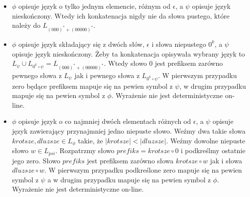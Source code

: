 \documentclass[a4paper]{article}
\begin{document}
\begin{enumerate}
\begin{itemize}
    \item $\phi$ opisuje język o tylko jednym elemencie, różnym od $\epsilon$, a $\psi$ opisuje język nieskończony. Wtedy ich konkatenacja nigdy nie da słowa pustego, które należy do $L_{(000)^* + (00000)^*}$.
    \item $\phi$ opisuje język składający się z dwóch słów, $\epsilon$ i słowa niepustego $0^k$, a $\psi$ opisuje język nieskończony. Żeby ta konkatenacja opisywała wybrany język to $L_{\psi} \cup L_{0^k \circ \psi} = L_{(000)^* + (00000)^*}$. Wtedy słowo $0$ jest prefiksem zarówno pewnego słowa z $L_{\psi}$ jak i pewnego słowa z $L_{0^k \circ \psi}$. W pierwszym przypadku zero będące prefiksem mapuje się na pewien symbol z $\psi$, w drugim przypadku mapuje się na pewien symbol z $\phi$. Wyrażenie nie jest deterministyczne on-line.

    \item $\phi$ opisuje język o co najmniej dwóch elementach różnych od $\epsilon$, a $\psi$ opisuje język zawierający przynajmniej jedno niepuste słowo. Weźmy dwa takie słowa $krotsze, dluzsze \in L_{\phi}$ takie, że $|krotsze| < |dluzsze|$. Weźmy dowolne niepuste słowo $w \in L_{psi}$. Rozpatrzmy słowo $prefiks = krotsze \circ 0$ i podkreślmy ostatnie jego zero. Słowo $prefiks$ jest prefiksem zarówno słowa $krotsze \circ w$ jak i słowa $dluzsze \circ w$. W pierwszym przypadku podkreślone zero mapuje się na pewien symbol z $\psi$ a w drugim przypadku mapuje się na pewien symbol z $\phi$. Wyrażenie nie jest deterministyczne on-line.
  \end{itemize}
\end{enumerate}
\end{document}
